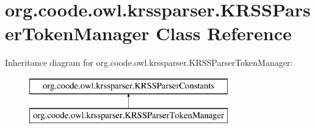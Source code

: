 \hypertarget{classorg_1_1coode_1_1owl_1_1krssparser_1_1_k_r_s_s_parser_token_manager}{\section{org.\-coode.\-owl.\-krssparser.\-K\-R\-S\-S\-Parser\-Token\-Manager Class Reference}
\label{classorg_1_1coode_1_1owl_1_1krssparser_1_1_k_r_s_s_parser_token_manager}
}
Inheritance diagram for org.\-coode.\-owl.\-krssparser.\-K\-R\-S\-S\-Parser\-Token\-Manager\-:\begin{figure}[H]
\begin{center}
\leavevmode
\includegraphics[height=2.000000cm]{classorg_1_1coode_1_1owl_1_1krssparser_1_1_k_r_s_s_parser_token_manager}
\end{center}
\end{figure}
